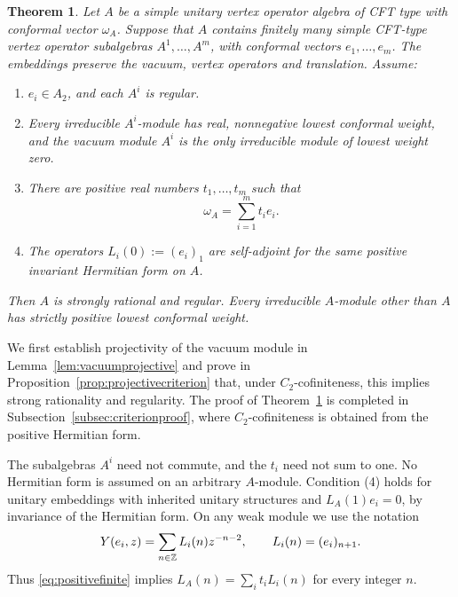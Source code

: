 \documentclass[11pt,reqno]{amsart}
\newtheorem{theorem}{Theorem}[section]
\theoremstyle{definition}\newtheorem{definition}[theorem]{Definition}
\theoremstyle{remark}\newtheorem{remark}[theorem]{Remark}
\numberwithin{equation}{section}
\begin{document}
\begin{theorem}\label{thm:positivecriterion}
Let $A$ be a simple unitary vertex operator algebra of CFT type with conformal vector $\omega_A$. Suppose that $A$ contains finitely many simple CFT-type vertex operator subalgebras $A^1,\ldots,A^m$, with conformal vectors $e_1,\ldots,e_m$. The embeddings preserve the vacuum, vertex operators and translation. Assume:
\begin{enumerate}
\item $e_i\in A_2$, and each $A^i$ is regular.
\item Every irreducible $A^i$-module has real, nonnegative lowest conformal weight, and the vacuum module $A^i$ is the only irreducible module of lowest weight zero.
\item There are positive real numbers $t_1,\ldots,t_m$ such that
\begin{equation}\label{eq:positivefinite}
 \omega_A=\sum_{i=1}^m t_i e_i.
\end{equation}
\item The operators $L_i(0):=(e_i)_1$ are self-adjoint for the same positive invariant Hermitian form on $A$.
\end{enumerate}
Then $A$ is strongly rational and regular. Every irreducible $A$-module other than $A$ has strictly positive lowest conformal weight.
\end{theorem}

We first establish projectivity of the vacuum module in Lemma~\ref{lem:vacuumprojective} and prove in Proposition~\ref{prop:projectivecriterion} that, under $C_2$-cofiniteness, this implies strong rationality and regularity. The proof of Theorem~\ref{thm:positivecriterion} is completed in Subsection~\ref{subsec:criterionproof}, where $C_2$-cofiniteness is obtained from the positive Hermitian form.

The subalgebras $A^i$ need not commute, and the $t_i$ need not sum to one. No Hermitian form is assumed on an arbitrary $A$-module. Condition (4) holds for unitary embeddings with inherited unitary structures and $L_A(1)e_i=0$, by invariance of the Hermitian form. On any weak module we use the notation
\[
 Y(e_i,z)=\sum_{n\in\mathbb Z}L_i(n)z^{-n-2},\qquad
 L_i(n)=(e_i)_{n+1}.
\]
Thus \eqref{eq:positivefinite} implies $L_A(n)=\sum_i t_iL_i(n)$ for every integer $n$.
\end{document}
